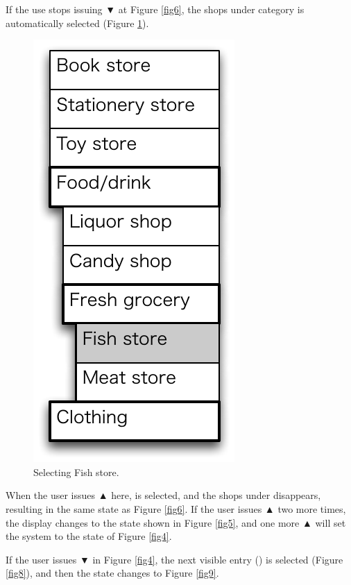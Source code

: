 \documentclass{article}
\def\up{▲}
\def\down{▼}
\begin{document}
If the use stops issuing {\down} at Figure \ref{fig6},
the shops under category  is automatically selected (Figure \ref{fig7}).

\begin{figure}[H]
\centerline{\includegraphics[width=\menuwidth,bb=0 0 139 292]{figures/fig7.pdf}}
\caption{Selecting Fish store.}
\label{fig7}
\end{figure}

When the user issues {\up} here,  is selected,
and the shops under  disappears, 
resulting in the same state as Figure \ref{fig6}.
If the user issues {\up} two more times, the display changes to the state
shown in Figure \ref{fig5},
and one more {\up} will set the system to the state of Figure \ref{fig4}.

If the user issues {\down} in Figure \ref{fig4}, the next visible entry
() is selected (Figure \ref{fig8}), and then the state changes to Figure \ref{fig9}.
\end{document}
